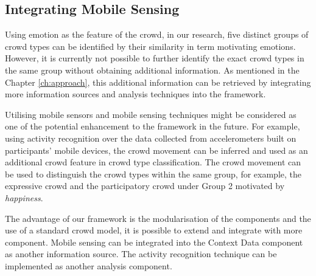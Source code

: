 \subsection{Integrating Mobile Sensing}
Using emotion as the feature of the crowd, in our research, five distinct groups of crowd types can be identified by their similarity in term motivating emotions. However, it is currently not possible to further identify the exact crowd types in the same group without obtaining additional information. As mentioned in the Chapter \ref{ch:approach}, this additional information can be retrieved by integrating more information sources and analysis techniques into the framework. 

Utilising mobile sensors and mobile sensing techniques might be considered as one of the potential enhancement to the framework in the future. For example, using activity recognition over the data collected from accelerometers built on participants’ mobile devices, the crowd movement can be inferred and used as an additional crowd feature in crowd type classification. The crowd movement can be used to distinguish the crowd types within the same group, for example, the expressive crowd and the participatory crowd under Group 2 motivated by \textit{happiness}.

The advantage of our framework is the modularisation of the components and the use of a standard crowd model, it is possible to extend and integrate with more component. Mobile sensing can be integrated into the Context Data component as another information source. The activity recognition technique can be implemented as another analysis component.